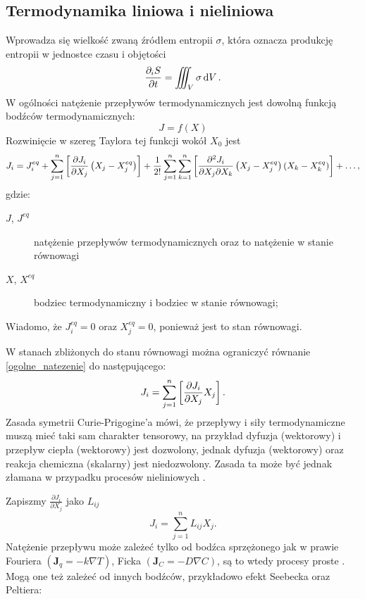 \documentclass[10pt, a4paper, twoside, onecolumn]{article}
\numberwithin{equation}{section}
\begin{document}
	\subsection{Termodynamika liniowa i nieliniowa}
	Wprowadza się wielkość zwaną źródłem entropii \(\sigma\), która oznacza produkcję entropii w jednostce czasu i objętości
	\begin{equation}
		\pdv{_{i}S}{t} = \iiint_{V}\sigma\dd{V}.
	\end{equation}
	W ogólności natężenie przepływów termodynamicznych jest dowolną funkcją bodźców termodynamicznych: 
	\[J=f\left(X\right)\]
	Rozwinięcie w szereg Taylora tej funkcji wokół \(X_{0}\) jest
	\begin{equation}\label{ogolne_natezenie}
		J_{i}=J_{i}^{eq}+\sum_{j=1}^{n}\left[\pdv{J_{i}}{X_{j}}\left(X_{j}-X_{j}^{eq}\right)\right]+\frac{1}{2!}\sum_{j=1}^{n}\sum_{k=1}^{n}\left[\pdv{J_{i}}{X_{j}}{X_{k}}\left(X_{j}-X_{j}^{eq}\right)\left(X_{k}-X_{k}^{eq}\right)\right]+\ldots,
	\end{equation}
	gdzie:
	\begin{description}
		\item[\(J\), \(J^{eq}\)] natężenie przepływów termodynamicznych oraz to natężenie w stanie równowagi
		\item[\(X\), \(X^{eq}\)] bodziec termodynamiczny i bodziec w stanie równowagi; 
	\end{description}
	Wiadomo, że \(J_{i}^{eq}=0\) oraz \(X_{j}^{eq}=0\), ponieważ jest to stan równowagi. \par
	W stanach zbliżonych do stanu równowagi można ograniczyć równanie \eqref{ogolne_natezenie} do następującego: 
	\begin{equation}\label{natezenie_liniowe}
		J_{i}=\sum_{j=1}^{n}\left[\pdv{J_{i}}{X_{j}}X_{j}\right].
	\end{equation}
	Zasada symetrii Curie-Prigogine'a mówi, że przepływy i siły termodynamiczne muszą mieć taki sam charakter tensorowy, na przykład dyfuzja (wektorowy) i przepływ ciepła (wektorowy) jest dozwolony, jednak dyfuzja (wektorowy)  oraz reakcja chemiczna (skalarny) jest niedozwolony. Zasada ta może być jednak złamana w przypadku procesów nieliniowych \cite{orlik}. \par
	Zapiszmy \(\frac{\partial J_{i}}{\partial X_{j}}\) jako \(L_{ij}\)
	\begin{equation}
		J_{i}=\sum_{j=1}^{n}L_{ij}X_{j}.
	\end{equation}
	Natężenie przepływu może zależeć tylko od bodźca sprzężonego jak w prawie Fouriera \(\left(\boldsymbol{J}_{q}=-k\nabla T\right)\), Ficka \(\left(\boldsymbol{J}_{C}=-D\nabla C\right)\), są to wtedy procesy proste \cite{orlik}. Mogą one też zależeć od innych bodźców, przykładowo efekt Seebecka oraz Peltiera: \cite{Ceynowa2008}
\end{document}

